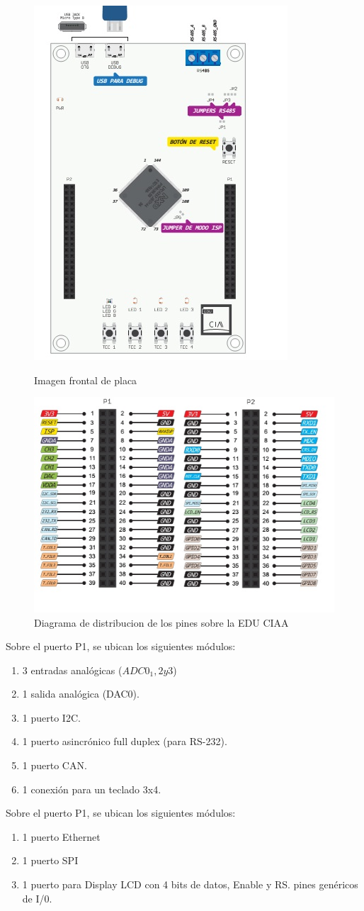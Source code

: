 \documentclass[conference]{IEEEtran}
\begin{document}
\begin{figure}[!t]
\centering
\includegraphics[width=8 cm]{figuras/FIGURA_1.jpg}\\
\caption{Imagen frontal de placa}
\label{Fig2}
\end{figure}

\begin{figure}[!t]
\centering
\includegraphics[width=8 cm]{figuras/FIGURA_2.jpg}
\caption{Diagrama de distribucion de los pines sobre la EDU CIAA }
\label{Fig1}
\end{figure}

Sobre el puerto P1, se ubican los siguientes módulos:
\begin{enumerate}
\item 3 entradas analógicas ($ADC0_ 1,2 y 3$)
\item 1 salida analógica (DAC0).
\item 1 puerto I2C.
\item 1 puerto asincrónico full duplex (para RS-232).
\item 1 puerto CAN.
\item 1 conexión para un teclado 3x4.
\end{enumerate}
Sobre el puerto P1, se ubican los siguientes módulos:
\begin{enumerate}
\item 1 puerto Ethernet
\item 1 puerto SPI
\item 1 puerto para Display LCD con 4 bits de datos, Enable y RS.
\9 pines genéricos de I/0.
\end{enumerate}
\end{document}
